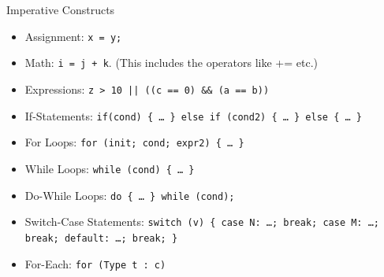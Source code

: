 \documentclass{beamer}
\begin{document}
\begin{frame}{Imperative Constructs}
\begin{itemize}
\item Assignment: {\tt x = y;}
\item Math: {\tt i = j + k}. (This includes the operators like += etc.)
\item Expressions: {\tt z > 10 || ((c == 0) \&\& (a == b))}
\item If-Statements: {\tt if(cond) \{ \ldots~\} else if (cond2) \{ \ldots~\}  else  \{ \ldots~\} }
\item For Loops: {\tt for (init; cond; expr2) \{ \ldots~\} }
\item While Loops: {\tt while (cond) \{ \ldots~\} }
\item Do-While Loops: {\tt do \{ \ldots~\} while (cond); }
\item Switch-Case Statements: {\tt switch (v) \{ case N: \ldots; break; case M: \ldots; break; default: \ldots; break; \} }
\item For-Each: {\tt for (Type t : c)}
\end{itemize}
\end{frame}
\end{document}
